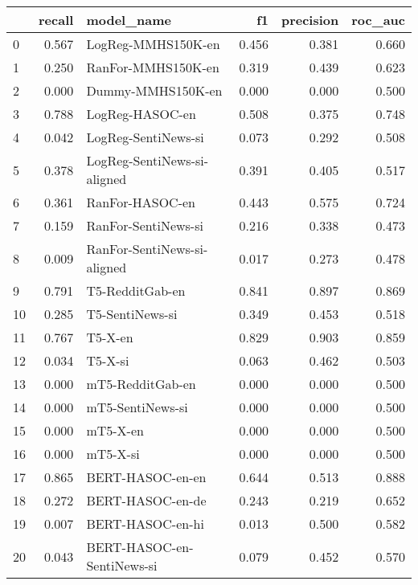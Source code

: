 \begin{tabular}{lrlrrr}
\toprule
{} &  recall &                   model\_name &    f1 &  precision &  roc\_auc \\
\midrule
0  &   0.567 &           LogReg-MMHS150K-en & 0.456 &      0.381 &    0.660 \\
1  &   0.250 &           RanFor-MMHS150K-en & 0.319 &      0.439 &    0.623 \\
2  &   0.000 &            Dummy-MMHS150K-en & 0.000 &      0.000 &    0.500 \\
3  &   0.788 &              LogReg-HASOC-en & 0.508 &      0.375 &    0.748 \\
4  &   0.042 &          LogReg-SentiNews-si & 0.073 &      0.292 &    0.508 \\
5  &   0.378 &  LogReg-SentiNews-si-aligned & 0.391 &      0.405 &    0.517 \\
6  &   0.361 &              RanFor-HASOC-en & 0.443 &      0.575 &    0.724 \\
7  &   0.159 &          RanFor-SentiNews-si & 0.216 &      0.338 &    0.473 \\
8  &   0.009 &  RanFor-SentiNews-si-aligned & 0.017 &      0.273 &    0.478 \\
9  &   0.791 &              T5-RedditGab-en & 0.841 &      0.897 &    0.869 \\
10 &   0.285 &              T5-SentiNews-si & 0.349 &      0.453 &    0.518 \\
11 &   0.767 &                      T5-X-en & 0.829 &      0.903 &    0.859 \\
12 &   0.034 &                      T5-X-si & 0.063 &      0.462 &    0.503 \\
13 &   0.000 &             mT5-RedditGab-en & 0.000 &      0.000 &    0.500 \\
14 &   0.000 &             mT5-SentiNews-si & 0.000 &      0.000 &    0.500 \\
15 &   0.000 &                     mT5-X-en & 0.000 &      0.000 &    0.500 \\
16 &   0.000 &                     mT5-X-si & 0.000 &      0.000 &    0.500 \\
17 &   0.865 &             BERT-HASOC-en-en & 0.644 &      0.513 &    0.888 \\
18 &   0.272 &             BERT-HASOC-en-de & 0.243 &      0.219 &    0.652 \\
19 &   0.007 &             BERT-HASOC-en-hi & 0.013 &      0.500 &    0.582 \\
20 &   0.043 &   BERT-HASOC-en-SentiNews-si & 0.079 &      0.452 &    0.570 \\

\end{tabular}

